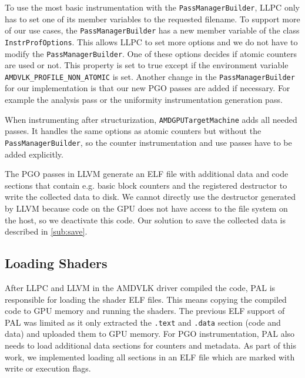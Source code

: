 To use the most basic instrumentation with the \texttt{PassManagerBuilder}, LLPC only has to set one of its member variables to the requested filename.
To support more of our use cases, the \texttt{PassManagerBuilder} has a new member variable of the class \texttt{InstrProfOptions}.
This allows LLPC to set more options and we do not have to modify the \texttt{PassManagerBuilder}.
One of these options decides if atomic counters are used or not.
This property is set to true except if the environment variable \texttt{AMDVLK\_PROFILE\_NON\_ATOMIC} is set.
Another change in the \texttt{PassManagerBuilder} for our implementation is that our new PGO passes are added if necessary.
For example the analysis pass or the uniformity instrumentation generation pass.

When instrumenting after structurization, \texttt{AMDGPUTargetMachine} adds all needed passes.
It handles the same options as atomic counters but without the \texttt{PassManagerBuilder}, so the counter instrumentation and use passes have to be added explicitly.

The PGO passes in LLVM generate an ELF file with additional data and code sections that contain e.g. basic block counters and the registered destructor to write the collected data to disk.
We cannot directly use the destructor generated by LLVM because code on the GPU does not have access to the file system on the host, so we deactivate this code.
Our solution to save the collected data is described in \cref{sub:save}.

\subsection{Loading Shaders}
\label{sub:loading}
After LLPC and LLVM in the AMDVLK driver compiled the code, PAL is responsible for loading the shader ELF files.
This means copying the compiled code to GPU memory and running the shaders.
The previous ELF support of PAL was limited as it only extracted the \texttt{.text} and \texttt{.data} section (code and data) and uploaded them to GPU memory.
For PGO instrumentation, PAL also needs to load additional data sections for counters and metadata.
As part of this work, we implemented loading all sections in an ELF file which are marked with write or execution flags.

